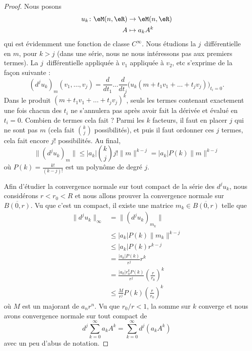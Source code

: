 \begin{proof}
    Nous posons 
    \begin{equation}
        \begin{aligned}
            u_k\colon \eM(n,\eR)&\to \eM(n,\eR) \\
            A&\mapsto a_kA^k 
        \end{aligned}
    \end{equation}
    qui est évidemment une fonction de classe \(  C^{\infty}\). Nous étudions la \( j\)\ieme\ différentielle en \( m\), pour \( k>j\) (dans une série, nous ne nous intéressons pas aux premiers termes). La \( j\)\ieme\ différentielle appliquée à \( v_1\) appliquée à \( v_2\), etc s'exprime de la façon suivante :
    \begin{equation}
        (d^ju_k)_m(v_1,\ldots, v_j)=\frac{ d  }{ d t_1 }\ldots\frac{ d  }{ d t_j }\Big( u_k(m+t_1v_1+\ldots +t_jv_j)    \Big)_{t_i=0}.
    \end{equation}
    Dans le produit \( (m+t_1v_1+\ldots +t_jv_j)^k\), seuls les termes contenant exactement une fois chacun des \( t_i\) ne s'annulera pas après avoir fait la dérivée et évalué en \( t_i=0\). Combien de termes cela fait ? Parmi les \( k\) facteurs, il faut en placer \( j\) qui ne sont pas \( m\) (cela fait \( \binom{ k }{ j }\) possibilités), et puis il faut ordonner ces \( j\) termes, cela fait encore \( j!\) possibilités. Au final,
    \begin{equation}
        \| (d^ju_k)_m \|\leq | a_k | \binom{ k }{ j }j!\| m \|^{k-j}=| a_k |P(k)\| m \|^{k-j}
    \end{equation}
    où \( P(k)=\frac{ k! }{ (k-j)! }\) est un polynôme de degré \( j\).

    Afin d'étudier la convergence normale sur tout compact de la série des \( d^ju_k\), nous considérons \( r<r_0<R\) et nous allons prouver la convergence normale sur \( \overline{ B(0,r) }\). Vu que c'est un compact, il existe une matrice \( m_k\in\overline{ B(0,r) }\) telle que
    \begin{subequations}
        \begin{align}
            \| d^ju_k \|_{\infty}&=\| (d^ju_k)_{m_k} \|\\
            &\leq | a_k |P(k)\| m_k \|^{k-j}\\
            &\leq | a_k |P(k)r^{k-j}\\
            &=\frac{ | a_k |P(k) }{ r^j }r^k\\
            &=\frac{ | a_k |r_0^kP(k) }{ r^j }\left( \frac{ r }{ r_0 } \right)^k\\
            &\leq \frac{ M }{ r^j }P(k)\left( \frac{ r }{ r_0 } \right)^k
        \end{align}
    \end{subequations}
    où \( M\) est un majorant de \( a_nr^n\). Vu que \( r_0/r<1\), la somme sur \( k\) converge et nous avons convergence normale sur tout compact de
    \begin{equation}
        d^j\sum_{k=0}^{\infty}a_kA^k=\sum_{k=0}^{\infty}d^j(a_kA^k)
    \end{equation}
    avec un peu d'abus de notation.
\end{proof}

